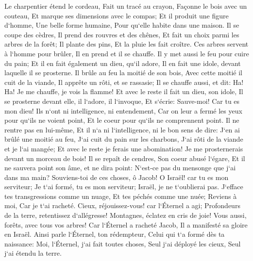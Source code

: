 \verse Le charpentier étend le cordeau, Fait un tracé au crayon, Façonne le bois avec un couteau, Et marque ses dimensions avec le compas; Et il produit une figure d`homme, Une belle forme humaine, Pour qu`elle habite dans une maison. 
\verse Il se coupe des cèdres, Il prend des rouvres et des chênes, Et fait un choix parmi les arbres de la forêt; Il plante des pins, Et la pluie les fait croître. 
\verse Ces arbres servent à l`homme pour brûler, Il en prend et il se chauffe. Il y met aussi le feu pour cuire du pain; Et il en fait également un dieu, qu`il adore, Il en fait une idole, devant laquelle il se prosterne. 
\verse Il brûle au feu la moitié de son bois, Avec cette moitié il cuit de la viande, Il apprête un rôti, et se rassasie; Il se chauffe aussi, et dit: Ha! Ha! Je me chauffe, je vois la flamme! 
\verse Et avec le reste il fait un dieu, son idole, Il se prosterne devant elle, il l`adore, il l`invoque, Et s`écrie: Sauve-moi! Car tu es mon dieu! 
\verse Ils n`ont ni intelligence, ni entendement, Car on leur a fermé les yeux pour qu`ils ne voient point, Et le coeur pour qu`ils ne comprennent point. 
\verse Il ne rentre pas en lui-même, Et il n`a ni l`intelligence, ni le bon sens de dire: J`en ai brûlé une moitié au feu, J`ai cuit du pain sur les charbons, J`ai rôti de la viande et je l`ai mangée; Et avec le reste je ferais une abomination! Je me prosternerais devant un morceau de bois! 
\verse Il se repaît de cendres, Son coeur abusé l`égare, Et il ne sauvera point son âme, et ne dira point: N`est-ce pas du mensonge que j`ai dans ma main? 
\verse Souviens-toi de ces choses, ô Jacob! O Israël! car tu es mon serviteur; Je t`ai formé, tu es mon serviteur; Israël, je ne t`oublierai pas. 
\verse J`efface tes transgressions comme un nuage, Et tes péchés comme une nuée; Reviens à moi, Car je t`ai racheté. 
\verse Cieux, réjouissez-vous! car l`Éternel a agi; Profondeurs de la terre, retentissez d`allégresse! Montagnes, éclatez en cris de joie! Vous aussi, forêts, avec tous vos arbres! Car l`Éternel a racheté Jacob, Il a manifesté sa gloire en Israël. 
\verse Ainsi parle l`Éternel, ton rédempteur, Celui qui t`a formé dès ta naissance: Moi, l`Éternel, j`ai fait toutes choses, Seul j`ai déployé les cieux, Seul j`ai étendu la terre. 
